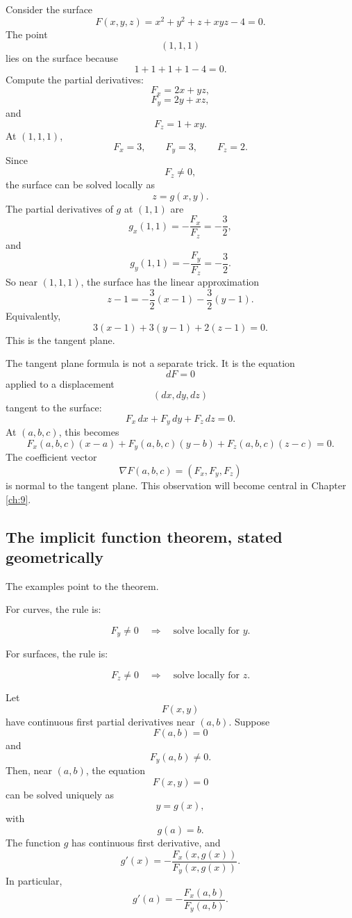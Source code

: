 \begin{example}
Consider the surface
\[
    F(x,y,z)=x^2+y^2+z+xyz-4=0.
\]
The point
\[
    (1,1,1)
\]
lies on the surface because
\[
    1+1+1+1-4=0.
\]
Compute the partial derivatives:
\[
    F_x=2x+yz,
\]
\[
    F_y=2y+xz,
\]
and
\[
    F_z=1+xy.
\]
At \((1,1,1)\),
\[
    F_x=3,
    \qquad
    F_y=3,
    \qquad
    F_z=2.
\]
Since
\[
    F_z\ne0,
\]
the surface can be solved locally as
\[
    z=g(x,y).
\]
The partial derivatives of \(g\) at \((1,1)\) are
\[
    g_x(1,1)=-\frac{F_x}{F_z}=-\frac32,
\]
and
\[
    g_y(1,1)=-\frac{F_y}{F_z}=-\frac32.
\]
So near \((1,1,1)\), the surface has the linear approximation
\[
    z-1
    =
    -\frac32(x-1)-\frac32(y-1).
\]
Equivalently,
\[
\boxed{
    3(x-1)+3(y-1)+2(z-1)=0.
}
\]
This is the tangent plane.
\end{example}

The tangent plane formula is not a separate trick.  It is the equation
\[
    dF=0
\]
applied to a displacement
\[
    (dx,dy,dz)
\]
tangent to the surface:
\[
    F_x\,dx+F_y\,dy+F_z\,dz=0.
\]
At \((a,b,c)\), this becomes
\[
\boxed{
    F_x(a,b,c)(x-a)
    +
    F_y(a,b,c)(y-b)
    +
    F_z(a,b,c)(z-c)
    =
    0.
}
\]
The coefficient vector
\[
    \nabla F(a,b,c)
    =
    (F_x,F_y,F_z)
\]
is normal to the tangent plane.  This observation will become central in Chapter
\ref{ch:9}.

\subsection{The implicit function theorem, stated geometrically}

The examples point to the theorem.

For curves, the rule is:

\[
    F_y\ne0
    \quad\Longrightarrow\quad
    \text{solve locally for }y.
\]

For surfaces, the rule is:

\[
    F_z\ne0
    \quad\Longrightarrow\quad
    \text{solve locally for }z.
\]

\begin{theorem}
Let
\[
    F(x,y)
\]
have continuous first partial derivatives near \((a,b)\).  Suppose
\[
    F(a,b)=0
\]
and
\[
    F_y(a,b)\ne0.
\]
Then, near \((a,b)\), the equation
\[
    F(x,y)=0
\]
can be solved uniquely as
\[
    y=g(x),
\]
with
\[
    g(a)=b.
\]
The function \(g\) has continuous first derivative, and
\[
\boxed{
    g'(x)=-\frac{F_x(x,g(x))}{F_y(x,g(x))}.
}
\]
In particular,
\[
\boxed{
    g'(a)=-\frac{F_x(a,b)}{F_y(a,b)}.
}
\]
\end{theorem}

